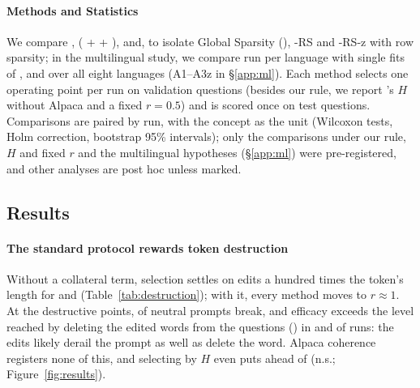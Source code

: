 \paragraph{Methods and Statistics}
We compare \ember{}, \cinder{} (\cs{} + \gs{} + \twj{}), \cinderz{} and, to isolate Global Sparsity (\gs{}), \cinder{}-RS and \cinder{}-RS-z with row sparsity; in the multilingual study, we compare \ember{} run per language with single fits of \ember{}, \cinder{} and \cinderz{} over all eight languages (A1--A3z in \S\ref{app:ml}).
Each method selects one operating point per run on validation questions (besides our rule, we report \ember{}'s $H$ without Alpaca and a fixed $r = 0.5$) and is scored once on test questions.
Comparisons are paired by run, with the concept as the unit (Wilcoxon tests, Holm correction, bootstrap 95\% intervals); only the comparisons under our rule, $H$ and fixed $r$ and the multilingual hypotheses (\S\ref{app:ml}) were pre-registered, and other analyses are post hoc unless marked.

\subsection{Results}
\label{sec:results}

\paragraph{The standard protocol rewards token destruction}
Without a collateral term, selection settles on edits a hundred times the token's length for \ember{} and \cinderz{} (Table~\ref{tab:destruction}); with it, every method moves to $r \approx 1$.
At the destructive points,  of neutral prompts break, and efficacy exceeds the level reached by deleting the edited words from the questions () in  and  of runs: the edits likely derail the prompt as well as delete the word.
Alpaca coherence registers none of this, and selecting by $H$ even puts \ember{} ahead of \cinder{} (n.s.; Figure~\ref{fig:results}).

